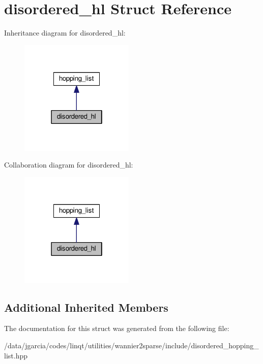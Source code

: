 \hypertarget{structdisordered__hl}{}\section{disordered\+\_\+hl Struct Reference}
\label{structdisordered__hl}


Inheritance diagram for disordered\+\_\+hl\+:\nopagebreak
\begin{figure}[H]
\begin{center}
\leavevmode
\includegraphics[width=154pt]{structdisordered__hl__inherit__graph}
\end{center}
\end{figure}


Collaboration diagram for disordered\+\_\+hl\+:\nopagebreak
\begin{figure}[H]
\begin{center}
\leavevmode
\includegraphics[width=154pt]{structdisordered__hl__coll__graph}
\end{center}
\end{figure}
\subsection*{Additional Inherited Members}


The documentation for this struct was generated from the following file\+:\begin{DoxyCompactItemize}
\item 
/data/jgarcia/codes/linqt/utilities/wannier2sparse/include/disordered\+\_\+hopping\+\_\+list.\+hpp\end{DoxyCompactItemize}

